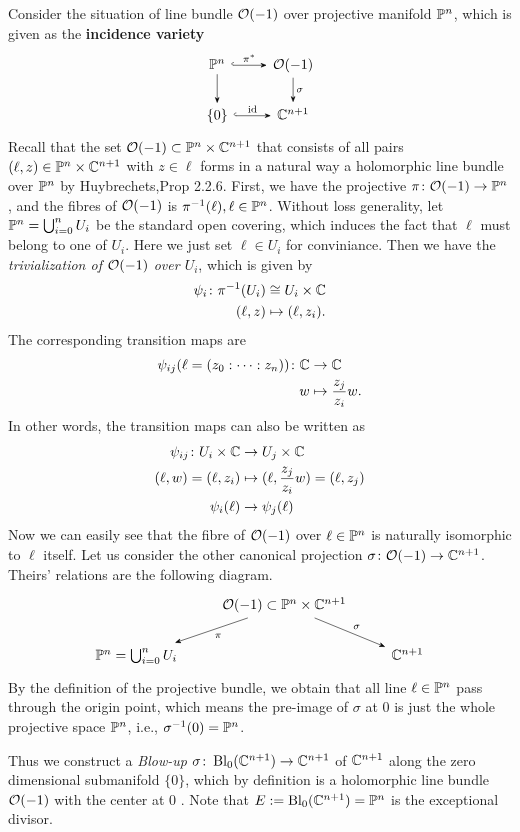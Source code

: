 \begin{exam}
    Consider the situation of line bundle ${\mathcal O}(-1)$ over projective manifold ${\mathbb P}^n$, which is given as the \textbf{incidence variety} 
    \[
        \begin{tikzcd}
\bP^n \ar[r,-Stealth,hook,"\pi^*"]\ar[d,-Stealth]&\mO(-1)\ar[d,-Stealth,"\sigma"]\\ 
\{0\}\ar[r,-Stealth,hook,"\operatorname*{id}"]&\bC^{n+1}
        \end{tikzcd}
    \]
    Recall that the set ${\mathcal O}(-1)\subset {\mathbb P}^n\times {\mathbb C}^{n+1}$ that consists of all pairs $(\ell,z)\in{\mathbb P}^n\times {\mathbb C}^{n+1}$ with $z\in\ell$ forms in a natural way a holomorphic line bundle over ${\mathbb P}^n$ by Huybrechets,Prop 2.2.6.  First, we have the projective $\pi\colon {\mathcal O}(-1)\to{\mathbb P}^n$, and the fibres of ${\mathcal O}(-1)$ is $\pi^{-1}(\ell) , \ell\in{\mathbb P}^n$. Without loss generality, let ${\mathbb P}^n=\bigcup_{i=0}^n U_i$ be the standard open covering, which induces the fact that $\ell$ must belong to one of $U_i$. Here we just set $\ell\in U_i$ for conviniance. Then we have the \textit{trivialization of ${\mathcal O}(-1)$ over $U_i$}, which is given by 
    \[
        \begin{aligned}
                   \psi_i\colon \pi^{-1}(U_i)&\cong U_i\times {\mathbb C}\\ 
                    (\ell,z)&\mapsto (\ell,z_i).
        \end{aligned}
    \] 
The corresponding transition maps are
\begin{align*}
    \psi_{ij}(\ell=(z_0:\cdots:z_n))\colon {\mathbb C}&\to{\mathbb C}\\ 
w&\mapsto \frac{z_j}{z_i}w.
\end{align*}
In other words, the transition maps can also be written as 
\begin{align*}
    \psi_{ij}\colon U_i\times{\mathbb C}&\to U_j\times {\mathbb C}\\ 
(\ell,w)=(\ell,z_i) &\mapsto (\ell,\frac{z_j}{z_i}w)=(\ell,z_j)\\ 
\psi_i(\ell) &\to \psi_j(\ell)
\end{align*}
Now we can easily see that the fibre of ${\mathcal O}(-1)$ over $\ell\in{\mathbb P}^n$ is naturally isomorphic to $\ell$ itself. Let us consider the other canonical projection $\sigma\colon {\mathcal O}(-1)\to {\mathbb C}^{n+1}$. Theirs' relations are the following diagram.
\[
    \begin{tikzcd}
        &\mO(-1)\subset \bP^n\times \bC^{n+1}\dlar[-Stealth,"\pi"]\drar[-Stealth,"\sigma"]&\\
        \bP^n=\bigcup_{i=0}^n U_i && \bC^{n+1}
    \end{tikzcd}
\]
By the definition of the projective bundle, we obtain that all line $\ell\in {\mathbb P}^n$ pass through the origin point, which means the pre-image of $\sigma$ at $0$ is just the whole projective space ${\mathbb P}^n$, i.e., $\sigma^{-1}(0)={\mathbb P}^n$. 

Thus we construct a \textit{Blow-up} $\sigma\colon \operatorname{Bl}_0 ({\mathbb C}^{n+1})\to{\mathbb C}^{n+1}$ of ${\mathbb C}^{n+1}$ along the zero dimensional submanifold $\{0\}$, which by definition is a holomorphic line bundle ${\mathcal O}(-1)$ with the center at $0$ . Note that $E:=\operatorname{Bl}_0 ({\mathbb C}^{n+1})={\mathbb P}^n$ is the exceptional divisor.
\end{exam}

